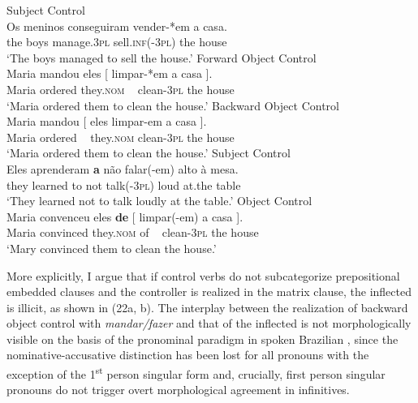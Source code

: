 \documentclass[output=paper]{langsci/langscibook}
\begin{document}
\ea%
    \label{ex:moreno:22}
    \ea  Subject Control\\ 
    \gll Os meninos  conseguiram  vender-*em   a casa.  \\
         the boys  manage.\textsc{3pl}   sell.\textsc{inf}(-\textsc{3pl}) the house\\
    \glt ‘The boys managed to sell the house.’
    \ex  Forward Object Control\\
    \gll Maria mandou   eles    [ limpar-*em a    casa ].    \\
         Maria ordered    they.\textsc{nom}  ~ clean{}-\textsc{3pl}     the house\\
    \glt ‘Maria ordered them  to clean the house.’
    \ex  Backward Object Control\\
    \gll Maria mandou       [ eles limpar-em a        casa ].    \\
         Maria ordered      ~    they.\textsc{nom}   clean{}-\textsc{3pl}     the house\\
    \glt ‘Maria ordered them to clean the house.’
    \z
\z\pagebreak
\ea%
    \label{ex:moreno:23}
    \ea  Subject Control\\
    \gll Eles     aprenderam \textbf{a}  não   falar(-em)  alto  à        mesa.\\
         they    learned         to not    talk({}-\textsc{3pl})    loud at.the table  \\
    \glt ‘They learned not to talk loudly at the table.’
    \ex  Object Control\\
    \gll Maria  convenceu eles          \textbf{de}  [  limpar(-em) a    casa ].     \\
         Maria  convinced they.\textsc{nom} of    ~ clean-\textsc{3pl}     the house\\
    \glt ‘Mary convinced them to clean the house.’
    \z
\z

More explicitly, I argue that if control verbs do not subcategorize prepositional embedded clauses and the controller is realized in the matrix clause, the inflected  is illicit, as shown in (22a, b). The interplay between the realization of backward object control with \textit{mandar\slash fazer} and that of the inflected  is not morphologically visible on the basis of the pronominal paradigm in spoken Brazilian , since the nominative-accusative distinction has been lost for all pronouns with the exception of the 1\textsuperscript{st} person singular form and, crucially, first person singular pronouns do not trigger overt morphological agreement in infinitives. 
\end{document}
